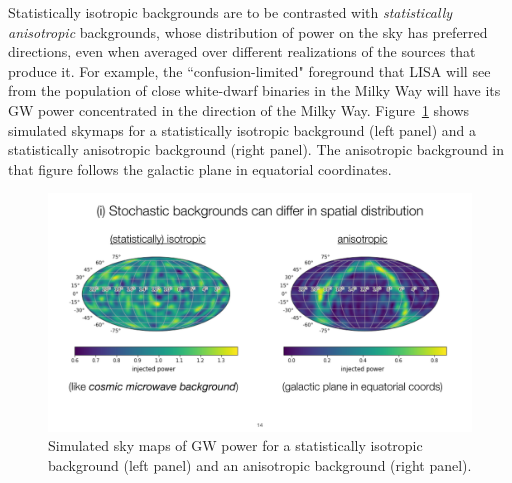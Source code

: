 Statistically isotropic backgrounds are to be contrasted
with {\em statistically anisotropic} backgrounds, 
whose distribution of power on the sky has preferred 
directions, even when averaged over different 
realizations of the sources that produce it.
For example, the ``confusion-limited" foreground that 
LISA will see from the population of close white-dwarf 
binaries in the Milky Way will have its GW
power concentrated in the direction of the Milky Way.
Figure~\ref{f:statiso-vs-aniso} shows simulated skymaps 
for a statistically isotropic background (left panel) and 
a statistically anisotropic background (right panel). 
The anisotropic background in that figure follows the
galactic plane in equatorial coordinates. 
%
\begin{figure}[htbp!]
\begin{center}
\includegraphics[width=\textwidth]{Figures/statiso-vs-aniso}
\caption{Simulated sky maps of GW power
for a statistically isotropic background (left panel) and an 
anisotropic background (right panel).}
\label{f:statiso-vs-aniso}
\end{center}
\end{figure}
%


